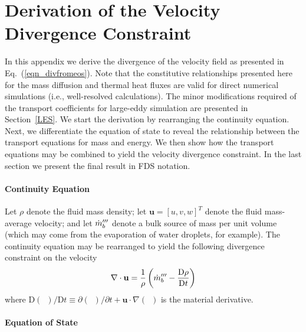 \chapter{Derivation of the Velocity Divergence Constraint}
\label{app_divergence}

In this appendix we derive the divergence of the velocity field as presented in Eq.~(\ref{eqn_divfromeos}). Note that the constitutive relationships presented here for the mass diffusion and thermal heat fluxes are valid for direct numerical simulations (i.e., well-resolved calculations). The minor modifications required of the transport coefficients for large-eddy simulation are presented in Section~\ref{LES}.  We start the derivation by rearranging the continuity equation. Next, we differentiate the equation of state to reveal the relationship between the transport equations for mass and energy. We then show how the transport equations may be combined to yield the velocity divergence constraint.  In the last section we present the final result in FDS notation.

\subsubsection{Continuity Equation}
\label{continuity}

Let $\rho$ denote the fluid mass density; let $\mathbf{u} = [u,v,w]^T$ denote the fluid mass-average velocity; and let $\dot{m}_b^{{\prime\prime\prime}}$
denote a bulk source of mass per unit volume (which may come from the evaporation of water droplets, for example).
The continuity equation may be rearranged to yield the following divergence constraint on the velocity
\begin{equation}
\label{eqn_divconstraint1}
\nabla\cdot \mathbf{u} = \frac{1}{\rho} \left( \dot{m}_b^{{\prime\prime\prime}} -  \frac{\mbox{D} \rho}{\mbox{D} t} \right)
\end{equation}
where $\mbox{D}(\,\,\,)/\mbox{D} t \equiv \partial (\,\,\,)/\partial t + \mathbf{u}\cdot\nabla(\,\,\,)$ is the material derivative.

\subsubsection{Equation of State}
\label{EOS}

